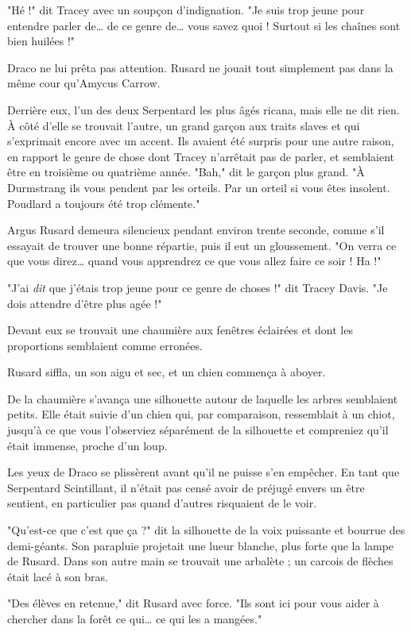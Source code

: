 "Hé !" dit Tracey avec un soupçon d'indignation. "Je suis trop jeune pour entendre parler de… de ce genre de… vous savez quoi ! Surtout si les chaînes sont bien huilées !"

Draco ne lui prêta pas attention. Rusard ne jouait tout simplement pas dans la même cour qu'Amycus Carrow.

Derrière eux, l'un des deux Serpentard les plus âgés ricana, mais elle ne dit rien. À côté d'elle se trouvait l'autre, un grand garçon aux traits slaves et qui s'exprimait encore avec un accent. Ils avaient été surpris pour une autre raison, en rapport le genre de chose dont Tracey n'arrêtait pas de parler, et semblaient être en troisième ou quatrième année. "Bah," dit le garçon plus grand. "À Durmstrang ils vous pendent par les orteils. Par un orteil si vous êtes insolent. Poudlard a toujours été trop clémente."

Argus Rusard demeura silencieux pendant environ trente seconde, comme s'il essayait de trouver une bonne répartie, puis il eut un gloussement. "On verra ce que vous direz… quand vous apprendrez ce que vous allez faire ce soir ! Ha !"

"J'ai \emph{dit}  que j'étais trop jeune pour ce genre de choses !" dit Tracey Davis. "Je dois attendre d'être plus agée !"

Devant eux se trouvait une chaumière aux fenêtres éclairées et dont les proportions semblaient comme erronées.

Rusard siffla, un son aigu et sec, et un chien commença à aboyer.

De la chaumière s'avança une silhouette autour de laquelle les arbres semblaient petits. Elle était suivie d'un chien qui, par comparaison, ressemblait à un chiot, jusqu'à ce que vous l'observiez séparément de la silhouette et compreniez qu'il était immense, proche d'un loup.

Les yeux de Draco se plissèrent avant qu'il ne puisse s'en empêcher. En tant que Serpentard Scintillant, il n'était pas censé avoir de préjugé envers un être sentient, en particulier pas quand d'autres risquaient de le voir.

"Qu'est-ce que c'est que ça ?" dit la silhouette de la voix puissante et bourrue des demi-géants. Son parapluie projetait une lueur blanche, plus forte que la lampe de Rusard. Dans son autre main se trouvait une arbalète ; un carcois de flèches était lacé à son bras.

"Des élèves en retenue," dit Rusard avec force. "Ils sont ici pour vous aider à chercher dans la forêt ce qui… ce qui les a mangées."

